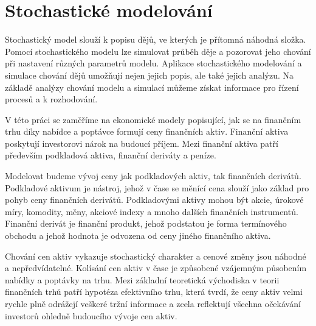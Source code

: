 \documentclass[a4paper,12pt]{report}
\theoremstyle{definition} \newtheorem{definice}[veta]{Definice}
\theoremstyle{remark}
\begin{document}

\chapter{Stochastické modelování}\label{stoch_model}

Stochastický model slouží k popisu dějů, ve kterých je přítomná náhodná složka.
Pomocí stochastického modelu lze simulovat průběh děje a pozorovat jeho chování při nastavení různých parametrů modelu.
Aplikace stochastického modelování a simulace chování dějů umožňují nejen jejich popis, ale také jejich analýzu.
Na základě analýzy chování modelu a simulací můžeme získat informace pro řízení procesů a k rozhodování.

V této práci se zaměříme na ekonomické modely popisující, jak se na finančním trhu díky nabídce a poptávce formují ceny finančních aktiv.
Finanční aktiva poskytují investorovi nárok na budoucí příjem.
Mezi finanční aktiva patří především podkladová aktiva, finanční deriváty a peníze.

Modelovat budeme vývoj ceny jak podkladových aktiv, tak finančních derivátů.
Podkladové aktivum je nástroj, jehož v čase se měnící cena slouží jako základ pro pohyb ceny finančních derivátů.
Podkladovými aktivy mohou být akcie, úrokové míry, komodity, měny, akciové indexy a mnoho dalších finančních instrumentů.
Finanční derivát je finanční produkt, jehož podstatou je forma termínového obchodu a jehož hodnota je odvozena od ceny jiného finančního aktiva.

Chování cen aktiv vykazuje stochastický charakter a cenové změny jsou náhodné a nepředvídatelné.
Kolísání cen aktiv v čase je způsobené vzájemným působením nabídky a poptávky na trhu.
Mezi základní teoretická východiska v teorii finančních trhů patří hypotéza efektivního trhu,
která tvrdí, že ceny aktiv velmi rychle plně odrážejí veškeré tržní informace
a zcela reflektují všechna očekávání investorů ohledně budoucího vývoje cen aktiv.
\end{document}
